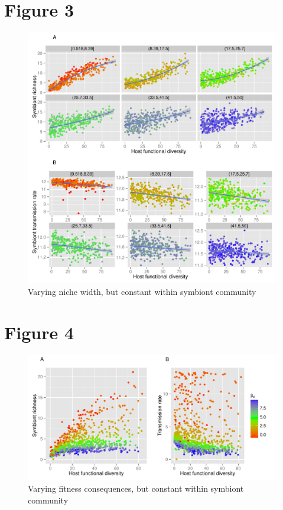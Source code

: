 \documentclass[12pt]{article}
\begin{document}
\newpage

\section*{Figure 3}

\begin{figure}[ht]\centering
\includegraphics[width=\linewidth]{fig/fig2.pdf}
\caption{Varying niche width, but constant within symbiont community}
\label{f3}
\end{figure}

\newpage

\section*{Figure 4}

\begin{figure}[ht]\centering
\includegraphics[width=\linewidth]{fig/fig3.pdf}
\caption{Varying fitness consequences, but constant within symbiont community}
\label{f4}
\end{figure}
\end{document}
